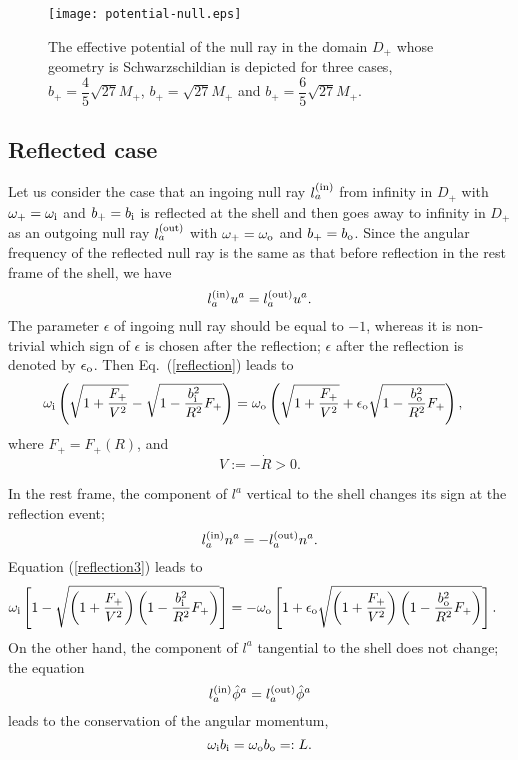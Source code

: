 \documentclass[aps,preprint,preprintnumber,nofootinbib,amsmath,amssymb,ascmac,bm,12pt]{revtex4}
\newcommand{\omi}{\omega_{\rm i}}
\newcommand{\omo}{\omega_{\rm o}}
\newcommand{\bi}{b_{\rm i}}
\newcommand{\bo}{b_{\rm o}}
\begin{document}
\begin{figure}[htbp]
 \begin{center}
 \texttt{[image: potential-null.eps]}
 \end{center}
 \caption{
The effective potential of the null ray in the domain $D_+$ whose geometry is Schwarzschildian 
is depicted for three cases, $b_+=\dfrac{4}{5}\sqrt{27}M_+$, $b_+=\sqrt{27}M_+$ 
and $b_+=\dfrac{6}{5}\sqrt{27}M_+$. 
 }
 \label{null-potential}
\end{figure}


 
\subsection{Reflected case}

Let us consider the case that an ingoing null ray $l_a^{\rm (in)}$ from infinity in $D_+$  
with $\omega_+=\omi$ and $b_+=b_{\rm i}$ is reflected at the shell 
and then goes away to infinity in $D_+$ as an outgoing null ray  
$l_a^{\rm (out)}$ with $\omega_+=\omo$ and $b_+=b_{\rm o}$. 
Since the angular frequency of the reflected null ray 
is the same as that before reflection in the rest frame of the shell, we have
\begin{equation}
l_a^{\rm (in)}u^a=l _a^{\rm (out)}u^a. \label{reflection}
\end{equation}
The parameter $\epsilon$ of ingoing null ray should be equal to $-1$, 
whereas it is non-trivial which sign of $\epsilon$ is chosen after the reflection; 
$\epsilon$ after the reflection is denoted by $\epsilon_{\rm o}$. 
Then Eq.~(\ref{reflection}) leads to
\begin{align}
&\omi\left(\sqrt{1+\frac{F_+}{V^2}}
-\sqrt{1-\frac{\bi^2}{R^2}F_+} \right)
=\omo\left(\sqrt{1+\frac{F_+}{V^2}}
+\epsilon_{\rm o}\sqrt{1-\frac{\bo^2}{R^2}F_+}\right), \label{reflection2}
\end{align}
where $F_+=F_+(R)$, and
\begin{equation}
V:=-\dot{R}>0. \label{V-def}
\end{equation}


In the rest frame, the component of $l^a$ vertical to the shell changes its sign at the reflection event; 
\begin{equation}
l_a^{\rm (in)}n^a=-l _a^{\rm (out)}n^a. \label{reflection3}
\end{equation}
Equation (\ref{reflection3}) leads to
\begin{align}
&\omi\left[1-\sqrt{\left(1+\frac{F_+}{V^2}\right)
\left(1-\frac{\bi^2}{R^2}F_+\right)} \right]
=-\omo\left[1+\epsilon_{\rm o}\sqrt{\left(1+\frac{F_+}{V^2}\right)
\left(1-\frac{\bo^2}{R^2}F_+\right)} \right]. \label{reflection4}
\end{align}
On the other hand, the component of $l^a$ tangential to the shell does not change; the equation
$$
l_a^{\rm (in)}\hat{\phi}^a=l _a^{\rm (out)}\hat{\phi}^a
$$
leads to the conservation of the angular momentum, 
$$
\omi\bi=\omo\bo=:L.
$$
\end{document}

